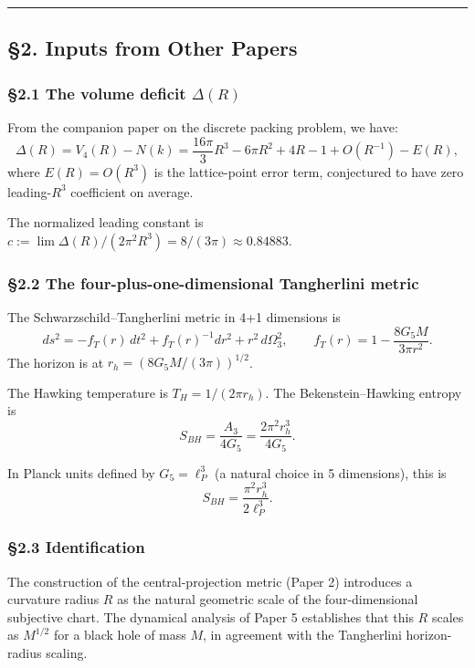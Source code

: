\documentclass[a4paper,11pt]{article}
\theoremstyle{definition}
\begin{document}
\begin{center}\rule{0.5\linewidth}{0.5pt}\end{center}

\subsection{§2. Inputs from Other
Papers}\label{inputs-from-other-papers}

\subsubsection{\texorpdfstring{§2.1 The volume deficit
\(\Delta(R)\)}{§2.1 The volume deficit \textbackslash Delta(R)}}\label{the-volume-deficit-deltar}

From the companion paper on the discrete packing problem, we have:
\[\Delta(R) = V_4(R) - N(k) = \frac{16\pi}{3} R^3 - 6\pi R^2 + 4R - 1 + O(R^{-1}) - E(R),\]
where \(E(R) = O(R^3)\) is the lattice-point error term, conjectured to
have zero leading-\(R^3\) coefficient on average.

The normalized leading constant is
\(c := \lim \Delta(R)/(2\pi^2 R^3) = 8/(3\pi) \approx 0.84883\).

\subsubsection{§2.2 The four-plus-one-dimensional Tangherlini
metric}\label{the-four-plus-one-dimensional-tangherlini-metric}

The Schwarzschild--Tangherlini metric in 4+1 dimensions is
\[ds^2 = -f_T(r)\, dt^2 + f_T(r)^{-1} dr^2 + r^2\, d\Omega_3^2, \qquad f_T(r) = 1 - \frac{8 G_5 M}{3\pi r^2}.\]
The horizon is at \(r_h = (8 G_5 M/(3\pi))^{1/2}\).

The Hawking temperature is \(T_H = 1/(2\pi r_h)\). The
Bekenstein--Hawking entropy is
\[S_{BH} = \frac{A_3}{4 G_5} = \frac{2\pi^2 r_h^3}{4 G_5}.\]

In Planck units defined by \(G_5 = \ell_P^3\) (a natural choice in 5
dimensions), this is \[S_{BH} = \frac{\pi^2 r_h^3}{2 \ell_P^3}.\]

\subsubsection{§2.3 Identification}\label{identification}

The construction of the central-projection metric (Paper 2) introduces a
curvature radius \(R\) as the natural geometric scale of the
four-dimensional subjective chart. The dynamical analysis of Paper 5
establishes that this \(R\) scales as \(M^{1/2}\) for a black hole of
mass \(M\), in agreement with the Tangherlini horizon-radius scaling.
\end{document}
